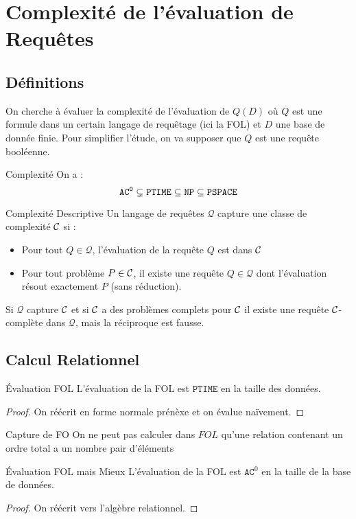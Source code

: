 \documentclass{cours}
\begin{document}
\section{Complexité de l'évaluation de Requêtes}
\subsection{Définitions}
On cherche à évaluer la complexité de l'évaluation de $Q(D)$ où $Q$ est une formule dans un certain langage de requêtage (ici la FOL) et $D$ une base de donnée finie. Pour simplifier l'étude, on va supposer que $Q$ est une requête booléenne.
\begin{propositionfr}{Complexité}{}
    On a : 
    \[
        \tt AC^{0} \subsetneq PTIME \subseteq NP \subseteq PSPACE
    \]
\end{propositionfr}
\begin{définition}{Complexité Descriptive}{}
    Un langage de requêtes $\mathcal{Q}$ capture une classe de complexité $\mathcal{C}$ si : 
    \begin{itemize}
        \item Pour tout $Q \in \mathcal{Q}$, l'évaluation de la requête $Q$ est dans $\mathcal{C}$
        \item Pour tout problème $P \in \mathcal{C}$, il existe une requête $Q \in \mathcal{Q}$ dont l'évaluation résout exactement $P$ (sans réduction).
    \end{itemize}
    Si $\mathcal{Q}$ capture $\mathcal{C}$ et si $\mathcal{C}$ a des problèmes complets pour $\mathcal{C}$ il existe une requête $\mathcal{C}$-complète dans $\mathcal{Q}$, mais la réciproque est fausse. 
\end{définition}

\subsection{Calcul Relationnel}
\begin{théorème}{Évaluation FOL}{}
    L'évaluation de la FOL est $\texttt{PTIME}$ en la taille des données.
\end{théorème}
\begin{proof}
    On réécrit en forme normale prénèxe et on évalue naïvement.
\end{proof}
\begin{théorème}{Capture de FO}{}
    On ne peut pas calculer dans $FOL$ qu'une relation contenant un ordre total a un nombre pair d'éléments
\end{théorème}

\begin{théorème}{Évaluation FOL mais Mieux}{}
    L'évaluation de la FOL est $\texttt{AC}^{0}$ en la taille de la base de données.
\end{théorème}
\begin{proof}
    On réécrit vers l'algèbre relationnel. 
\end{proof}
\end{document}
